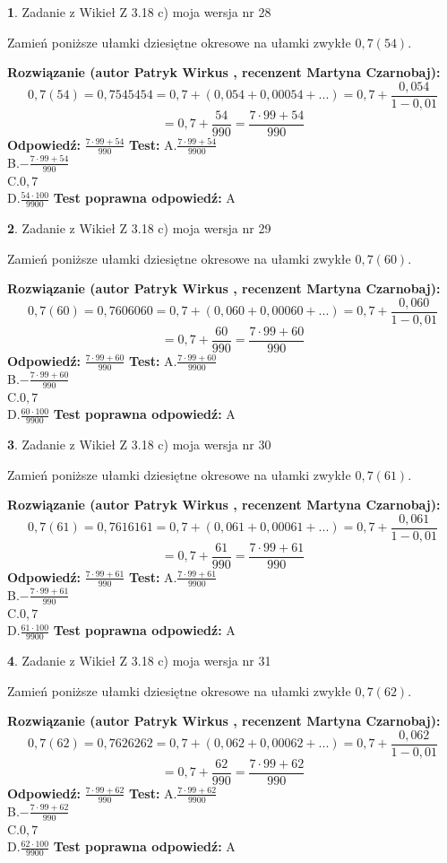 \documentclass[12pt, a4paper]{article}
\theoremstyle{definition} %
\newtheorem{zad}{}
\newcommand{\zadStart}[1]{\begin{zad}#1\newline}
\newcommand{\zadStop}{\end{zad}}
\newcommand{\rozwStart}[2]{\noindent \textbf{Rozwiązanie (autor #1 , recenzent #2): }\newline}
\newcommand{\rozwStop}{\newline}
\newcommand{\odpStart}{\noindent \textbf{Odpowiedź:}\newline}
\newcommand{\odpStop}{\newline}
\newcommand{\testStart}{\noindent \textbf{Test:}\newline}
\newcommand{\testStop}{\newline}
\newcommand{\kluczStart}{\noindent \textbf{Test poprawna odpowiedź:}\newline}
\newcommand{\kluczStop}{\newline}
\begin{document}
\zadStart{Zadanie z Wikieł Z 3.18 c) moja wersja nr 28}

Zamień poniższe ułamki dziesiętne okresowe na ułamki zwykłe $0,7(54)$.
\zadStop
\rozwStart{Patryk Wirkus}{Martyna Czarnobaj}
$$0,7(54)=0,7545454=0,7+(0,054+0,00054+...)=0,7+\frac{0,054}{1-0,01}$$
$$=0,7+\frac{54}{990}=\frac{7\cdot99+54}{990}$$
\rozwStop
\odpStart
$\frac{7\cdot99+54}{990}$
\odpStop
\testStart
A.$\frac{7\cdot99+54}{9900}$\\ B.$-\frac{7\cdot99+54}{990}$\\ C.$0,7$\\ D.$\frac{54\cdot100}{9900}$
\testStop
\kluczStart
A
\kluczStop



\zadStart{Zadanie z Wikieł Z 3.18 c) moja wersja nr 29}

Zamień poniższe ułamki dziesiętne okresowe na ułamki zwykłe $0,7(60)$.
\zadStop
\rozwStart{Patryk Wirkus}{Martyna Czarnobaj}
$$0,7(60)=0,7606060=0,7+(0,060+0,00060+...)=0,7+\frac{0,060}{1-0,01}$$
$$=0,7+\frac{60}{990}=\frac{7\cdot99+60}{990}$$
\rozwStop
\odpStart
$\frac{7\cdot99+60}{990}$
\odpStop
\testStart
A.$\frac{7\cdot99+60}{9900}$\\ B.$-\frac{7\cdot99+60}{990}$\\ C.$0,7$\\ D.$\frac{60\cdot100}{9900}$
\testStop
\kluczStart
A
\kluczStop



\zadStart{Zadanie z Wikieł Z 3.18 c) moja wersja nr 30}

Zamień poniższe ułamki dziesiętne okresowe na ułamki zwykłe $0,7(61)$.
\zadStop
\rozwStart{Patryk Wirkus}{Martyna Czarnobaj}
$$0,7(61)=0,7616161=0,7+(0,061+0,00061+...)=0,7+\frac{0,061}{1-0,01}$$
$$=0,7+\frac{61}{990}=\frac{7\cdot99+61}{990}$$
\rozwStop
\odpStart
$\frac{7\cdot99+61}{990}$
\odpStop
\testStart
A.$\frac{7\cdot99+61}{9900}$\\ B.$-\frac{7\cdot99+61}{990}$\\ C.$0,7$\\ D.$\frac{61\cdot100}{9900}$
\testStop
\kluczStart
A
\kluczStop



\zadStart{Zadanie z Wikieł Z 3.18 c) moja wersja nr 31}

Zamień poniższe ułamki dziesiętne okresowe na ułamki zwykłe $0,7(62)$.
\zadStop
\rozwStart{Patryk Wirkus}{Martyna Czarnobaj}
$$0,7(62)=0,7626262=0,7+(0,062+0,00062+...)=0,7+\frac{0,062}{1-0,01}$$
$$=0,7+\frac{62}{990}=\frac{7\cdot99+62}{990}$$
\rozwStop
\odpStart
$\frac{7\cdot99+62}{990}$
\odpStop
\testStart
A.$\frac{7\cdot99+62}{9900}$\\ B.$-\frac{7\cdot99+62}{990}$\\ C.$0,7$\\ D.$\frac{62\cdot100}{9900}$
\testStop
\kluczStart
A
\kluczStop
\end{document}
